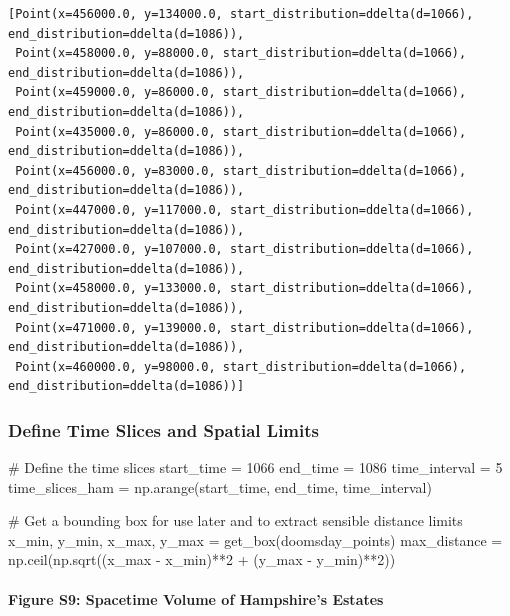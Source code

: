 \documentclass[
  11pt,
  letterpaper,
  DIV=11,
  numbers=noendperiod]{scrartcl}
\let\oldparagraph\paragraph
\renewcommand{\paragraph}[1]{\oldparagraph{#1}\mbox{}}
\newenvironment{Shaded}{\begin{snugshade}}{\end{snugshade}}
\newcommand{\CommentTok}[1]{\textcolor[rgb]{0.37,0.37,0.37}{#1}}
\newcommand{\DecValTok}[1]{\textcolor[rgb]{0.68,0.00,0.00}{#1}}
\newcommand{\NormalTok}[1]{\textcolor[rgb]{0.00,0.23,0.31}{#1}}
\newcommand{\OperatorTok}[1]{\textcolor[rgb]{0.37,0.37,0.37}{#1}}
\begin{document}
\begin{verbatim}
[Point(x=456000.0, y=134000.0, start_distribution=ddelta(d=1066), end_distribution=ddelta(d=1086)),
 Point(x=458000.0, y=88000.0, start_distribution=ddelta(d=1066), end_distribution=ddelta(d=1086)),
 Point(x=459000.0, y=86000.0, start_distribution=ddelta(d=1066), end_distribution=ddelta(d=1086)),
 Point(x=435000.0, y=86000.0, start_distribution=ddelta(d=1066), end_distribution=ddelta(d=1086)),
 Point(x=456000.0, y=83000.0, start_distribution=ddelta(d=1066), end_distribution=ddelta(d=1086)),
 Point(x=447000.0, y=117000.0, start_distribution=ddelta(d=1066), end_distribution=ddelta(d=1086)),
 Point(x=427000.0, y=107000.0, start_distribution=ddelta(d=1066), end_distribution=ddelta(d=1086)),
 Point(x=458000.0, y=133000.0, start_distribution=ddelta(d=1066), end_distribution=ddelta(d=1086)),
 Point(x=471000.0, y=139000.0, start_distribution=ddelta(d=1066), end_distribution=ddelta(d=1086)),
 Point(x=460000.0, y=98000.0, start_distribution=ddelta(d=1066), end_distribution=ddelta(d=1086))]
\end{verbatim}

\subsubsection{Define Time Slices and Spatial
Limits}\label{define-time-slices-and-spatial-limits}

\begin{Shaded}
\begin{Highlighting}[]
\CommentTok{\# Define the time slices}
\NormalTok{start\_time }\OperatorTok{=} \DecValTok{1066}
\NormalTok{end\_time }\OperatorTok{=} \DecValTok{1086}
\NormalTok{time\_interval }\OperatorTok{=} \DecValTok{5}
\NormalTok{time\_slices\_ham }\OperatorTok{=}\NormalTok{ np.arange(start\_time, end\_time, time\_interval)}

\CommentTok{\# Get a bounding box for use later and to extract sensible distance limits}
\NormalTok{x\_min, y\_min, x\_max, y\_max }\OperatorTok{=}\NormalTok{ get\_box(doomsday\_points)}
\NormalTok{max\_distance }\OperatorTok{=}\NormalTok{ np.ceil(np.sqrt((x\_max }\OperatorTok{{-}}\NormalTok{ x\_min)}\OperatorTok{**}\DecValTok{2} \OperatorTok{+}\NormalTok{ (y\_max }\OperatorTok{{-}}\NormalTok{ y\_min)}\OperatorTok{**}\DecValTok{2}\NormalTok{))}
\end{Highlighting}
\end{Shaded}

\paragraph{Figure S9: Spacetime Volume of Hampshire's
Estates}\label{figure-s9-spacetime-volume-of-hampshires-estates}
\end{document}
